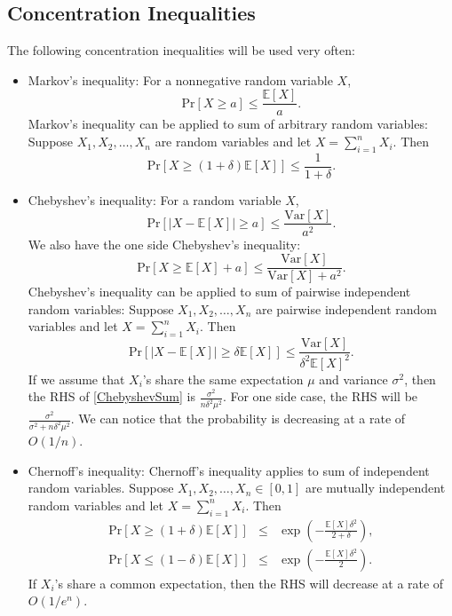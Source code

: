 \documentclass[openany]{book}
\begin{document}
\subsection{Concentration Inequalities}
The following concentration inequalities will be used very often:
\begin{itemize}
    \item Markov's inequality: For a nonnegative random variable $X$,
    \begin{equation}\label{Markov}
        \mathrm{Pr}[X\ge a]\le \frac{\mathbb{E}[X]}{a}.
    \end{equation}
    Markov's inequality can be applied to sum of arbitrary random variables: Suppose $X_1,X_2,\ldots,X_n$ are random variables and let $X=\sum_{i=1}^{n}X_i$. Then
    \begin{equation}\label{MarkovSum}
        \mathrm{Pr}[X\ge(1+\delta)\mathbb{E}[X]]\le \frac{1}{1+\delta}.
    \end{equation}

    \item Chebyshev's inequality: For a random variable $X$,
    \begin{equation}\label{Chebyshev}
        \mathrm{Pr}[|X-\mathbb{E}[X]|\ge a]\le \frac{\mathrm{Var}[X]}{a^2}.
    \end{equation}
    We also have the one side Chebyshev's inequality:
    \begin{equation}\label{oneSideChebushev}
        \mathrm{Pr}[X\ge \mathbb{E}[X]+a]\le \frac{\mathrm{Var}[X]}{\mathrm{Var}[X]+a^2}.
    \end{equation}
    Chebyshev's inequality can be applied to sum of pairwise independent random variables: Suppose $X_1,X_2,\ldots,X_n$ are pairwise independent random variables and let $X=\sum_{i=1}^{n}X_i$. Then
    \begin{equation}\label{ChebyshevSum}
        \mathrm{Pr}[|X-\mathbb{E}[X]|\ge\delta \mathbb{E}[X]]\le \frac{\mathrm{Var}[X]}{\delta^2 \mathbb{E}[X]^2}.
    \end{equation}
    If we assume that $X_i$'s share the same expectation $\mu$ and variance $\sigma^2$, then the RHS of \eqref{ChebyshevSum} is $\frac{\sigma^2}{n\delta^2\mu^2}$. For one side case, the RHS will be $\frac{\sigma^2}{\sigma^2+n\delta^2\mu^2}$. We can notice that the probability is decreasing at a rate of $O(1/n)$.

    \item Chernoff's inequality: Chernoff's inequality applies to sum of independent random variables. Suppose $X_1,X_2,\ldots,X_n\in[0,1]$ are mutually independent random variables and let $X=\sum_{i=1}^{n}X_i$. Then
    \begin{eqnarray}
        \mathrm{Pr}[X\ge(1+\delta)\mathbb{E}[X]] & \le & \exp\left(-\frac{\mathbb{E}[X]\delta^2}{2+\delta}\right), \\
        \mathrm{Pr}[X\le(1-\delta)\mathbb{E}[X]] & \le & \exp\left(-\frac{\mathbb{E}[X]\delta^2}{2}\right).
    \end{eqnarray}
    If $X_i$'s share a common expectation, then the RHS will decrease at a rate of $O(1/e^n)$.


\end{itemize}
\end{document}
